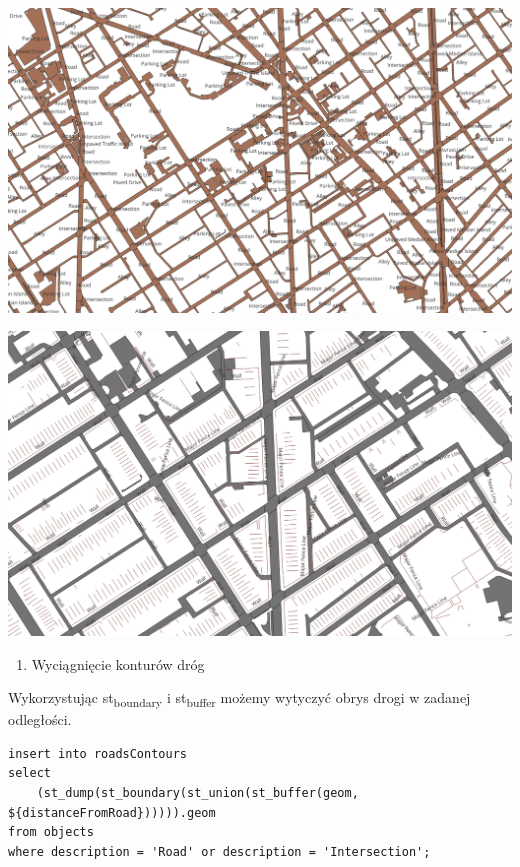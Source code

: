 \documentclass[11pt]{article}
\begin{document}
\begin{center}
\includegraphics[width=.9\linewidth]{./img/1.png}
\end{center}

\begin{center}
\includegraphics[width=.9\linewidth]{./img/10.png}
\end{center}

\begin{enumerate}
\item Wyciągnięcie konturów dróg
\end{enumerate}

Wykorzystując st\textsubscript{boundary} i st\textsubscript{buffer} możemy wytyczyć obrys drogi w zadanej odległości.

\begin{verbatim}
insert into roadsContours
select
    (st_dump(st_boundary(st_union(st_buffer(geom, ${distanceFromRoad}))))).geom
from objects
where description = 'Road' or description = 'Intersection';
\end{verbatim}
\end{document}

